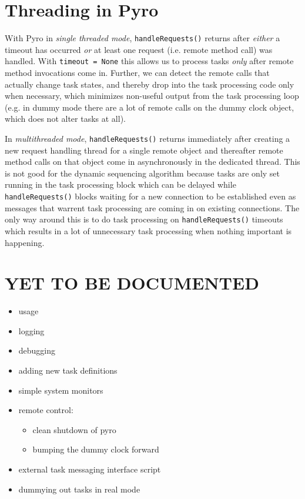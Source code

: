 \documentclass[11pt,a4paper]{article}
\begin{document}
\section{Threading in Pyro} \label{pyro-appendix}

With Pyro in {\em single threaded mode}, \verb#handleRequests()# returns
after {\em either} a timeout has occurred {\em or} at least one request
(i.e.  remote method call) was handled. With \verb#timeout = None# this
allows us to process tasks {\em only} after remote method invocations
come in.  Further, we can detect the remote calls that actually change
task states, and thereby drop into the task processing code only when
necessary, which minimizes non-useful output from the task processing
loop (e.g. in dummy mode there are a lot of remote calls on the dummy
clock object, which does not alter tasks at all). 

In {\em multithreaded mode}, \verb#handleRequests()# returns immediately
after creating a new request handling thread for a single remote object
and thereafter remote method calls on that object come in asynchronously
in the dedicated thread. This is not good for the dynamic sequencing
algorithm because tasks are only set running in the task processing
block which can be delayed while \verb#handleRequests()# blocks waiting
for a new connection to be established even as messages that warrent
task processing are coming in on existing connections. The only way
around this is to do task processing on \verb#handleRequests()# timeouts
which results in a lot of unnecessary task processing when nothing
important is happening.


\section{YET TO BE DOCUMENTED}

\begin{itemize}
 \item usage
 \item logging
 \item debugging
 \item adding new task definitions
 \item simple system monitors
 \item remote control: 
    \begin{itemize}
    \item clean shutdown of pyro
    \item bumping the dummy clock forward
    \end{itemize}
 \item external task messaging interface script
 \item dummying out tasks in real mode
\end{itemize}
\end{document}
